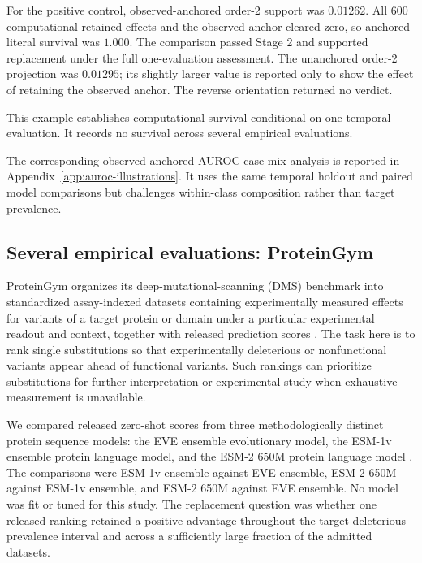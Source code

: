 \documentclass[11pt]{article}
\theoremstyle{remark}
\begin{document}
For the positive control, observed-anchored order-2 support was $0.01262$.
All 600 computational retained effects and the observed anchor cleared zero,
so anchored literal survival was $1.000$. The comparison passed Stage 2 and
supported replacement under the full one-evaluation assessment. The
unanchored order-2 projection was $0.01295$; its slightly larger value is
reported only to show the effect of retaining the observed anchor. The reverse
orientation returned no verdict.

This example establishes computational survival conditional on one temporal
evaluation. It records no survival across several empirical evaluations.

The corresponding observed-anchored AUROC case-mix analysis is reported in
Appendix~\ref{app:auroc-illustrations}. It uses the same temporal holdout and
paired model comparisons but challenges within-class composition rather than
target prevalence.

\subsection{Several empirical evaluations: ProteinGym}
\label{sec:proteingym-illustration}

ProteinGym organizes its deep-mutational-scanning (DMS) benchmark into
standardized assay-indexed datasets containing experimentally measured effects
for variants of a target protein or domain under a particular experimental
readout and context, together with released prediction scores
\cite{notin2023proteingym}. The task here is to rank single substitutions so
that experimentally deleterious or nonfunctional variants appear ahead of
functional variants. Such rankings can prioritize substitutions for further
interpretation or experimental study when exhaustive measurement is
unavailable.

We compared released zero-shot scores from three methodologically distinct
protein sequence models: the EVE ensemble evolutionary model, the ESM-1v
ensemble protein language model, and the ESM-2 650M protein language model
\cite{frazer2021eve,meier2021esm1v,lin2023esm2}. The comparisons were ESM-1v
ensemble against EVE ensemble, ESM-2 650M against ESM-1v ensemble, and ESM-2
650M against EVE ensemble. No model was fit or tuned for this study. The
replacement question was whether one released ranking retained a positive
advantage throughout the target deleterious-prevalence interval and across a
sufficiently large fraction of the admitted datasets.
\end{document}
